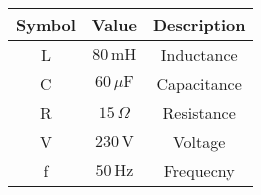 \begin{tabular}{c|c|c}
	\hline
	Symbol & Value & Description \\
	\hline
	L &  $80\, \text{mH}$ & Inductance\\
	C &  $60\, \mu\text{F}$ & Capacitance \\
	R &  $15\, \Omega$ & Resistance \\
	V & $230\, \text{V}$ & Voltage \\
	f & $50\, \text{Hz}$ & Frequecny \\
	\hline
\end{tabular}